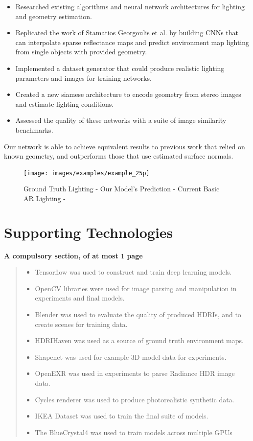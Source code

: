 \documentclass[ %
                    author={Gavin Parker},
                supervisor={Dr. Neill Campbell},
                    degree={MEng},
                     title={Deep Siamese Networks for Illumination Estimation from Stereo Images},
                  subtitle={},
                      type={research},
                      year={2018} ]{dissertation}
\begin{document}
\noindent
\begin{itemize}
\item Researched existing algorithms and neural network architectures for lighting and geometry estimation.
\item Replicated the work of Stamatios Georgoulis et al. by building CNNs that can interpolate sparse reflectance maps and predict environment map lighting from single objects with provided geometry.
\item Implemented a dataset generator that could produce realistic lighting parameters and images for training networks.
\item Created a new siamese architecture to encode geometry from stereo images and estimate lighting conditions.
\item Assessed the quality of these networks with a suite of image similarity benchmarks.
\end{itemize}

Our network is able to achieve equivalent results to previous work that relied on known geometry, and outperforms those that use estimated surface normals.

\begin{figure}
\centering
\texttt{[image: images/examples/example\_25p]}\\

\caption{Ground Truth Lighting - Our Model's Prediction - Current Basic AR Lighting - }
\label{example_1}
\end{figure}
\chapter*{Supporting Technologies}

{\bf A compulsory section, of at most $1$ page}
\vspace{1cm} 
\begin{quote}
\noindent
\begin{itemize}
\item Tensorflow was used to construct and train deep learning models.
\item OpenCV libraries were used for image parsing and manipulation in experiments and final models.
\item Blender was used to evaluate the quality of produced HDRIs, and to create scenes for training data.
\item HDRIHaven was used as a source of ground truth environment maps.
\item Shapenet was used for example 3D model data for experiments.
\item OpenEXR was used in experiments to parse Radiance HDR image data.
\item Cycles renderer was used to produce photorealistic synthetic data.
\item IKEA Dataset was used to train the final suite of models.
\item The BlueCrystal4 was used to train models across multiple GPUs
\end{itemize}
\end{quote}
\end{document}
